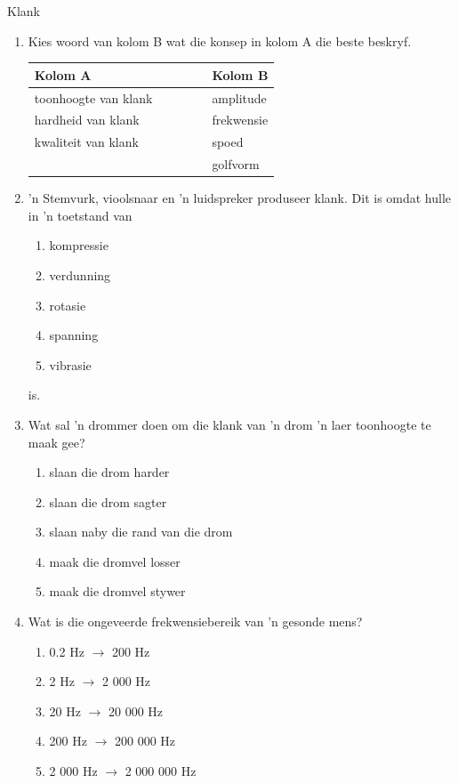 \begin{eocexercises}{Klank}
            \nopagebreak
\begin{enumerate}[noitemsep, label=\textbf{\arabic*}. ] 
\item Kies \n woord van kolom B wat die konsep in kolom A die beste beskryf. 
          \begin{center}
\begin{tabular}{ll}
\textbf{Kolom A} & \textbf{Kolom B} \\ \hline
toonhoogte van klank \ \ \ & amplitude \\
hardheid van klank \ \ \ \ \ \ \ \ \ & frekwensie \\
kwaliteit van klank \ \ \ & spoed \\
& golfvorm \\
\end{tabular}
\end{center}
    \par
\item 'n Stemvurk, vioolsnaar en 'n luidspreker produseer klank. Dit is omdat hulle in 'n toetstand van
\begin{enumerate}[noitemsep, label=\textbf{\alph*}. ] 
    \item kompressie
    \item verdunning
    \item rotasie
    \item spanning
    \item vibrasie
\end{enumerate}
is.

\item Wat sal 'n drommer doen om die klank van 'n drom 'n laer toonhoogte te maak gee?
\begin{enumerate}[noitemsep, label=\textbf{\alph*}. ] 
    \item slaan die drom harder
    \item slaan die drom sagter
    \item slaan naby die rand van die drom
    \item maak die dromvel losser
    \item maak die dromvel stywer
\end{enumerate}

\item Wat is die ongeveerde frekwensiebereik van 'n gesonde mens?
\begin{enumerate}[noitemsep, label=\textbf{\alph*}. ] 
\item 0.2 Hz $\to $ 200 Hz
\item 2 Hz $\to $ 2 000 Hz
\item 20 Hz $\to $ 20 000 Hz
\item 200 Hz $\to $ 200 000 Hz
\item 2 000 Hz $\to $ 2 000 000 Hz
\end{enumerate}
                

\end{enumerate}
\end{eocexercises}
